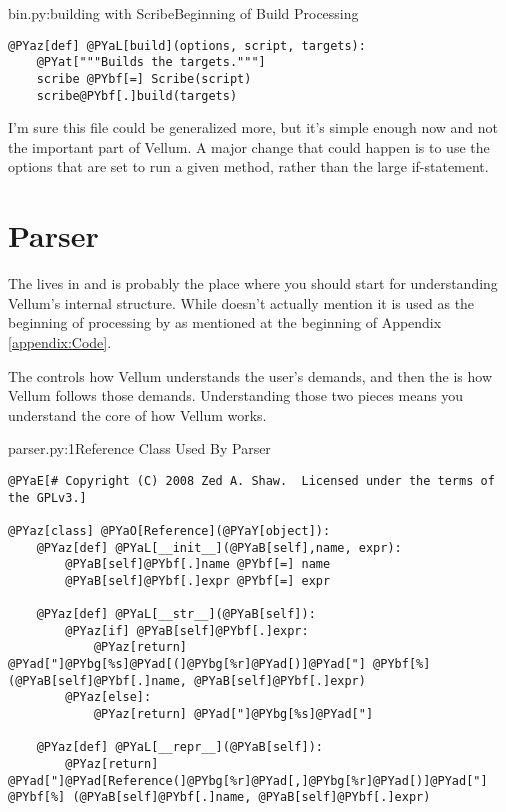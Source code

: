 \begin{code}{bin.py:building with Scribe}{Beginning of Build Processing}
\begin{Verbatim}[commandchars=@\[\]]
@PYaz[def] @PYaL[build](options, script, targets):
    @PYat["""Builds the targets."""]
    scribe @PYbf[=] Scribe(script)
    scribe@PYbf[.]build(targets)
\end{Verbatim}

\end{code}

I'm sure this file could be generalized more, but it's simple enough now and not
the important part of Vellum.  A major change that could happen is to use the
options that are set to run a given method, rather than the large if-statement.




\section{Parser}
\label{appendixA:parser}

The  lives in  and is probably the place where you should
start for understanding Vellum's internal structure.  While 
doesn't actually mention  it is used as the beginning of
processing by  as mentioned at the beginning of Appendix
\ref{appendix:Code}.

The 
controls how Vellum understands the user's demands, and then the 
is how Vellum follows those demands.  Understanding those two pieces means you
understand the core of how Vellum works.

\begin{code}{parser.py:1}{Reference Class Used By Parser}
\begin{Verbatim}[commandchars=@\[\]]
@PYaE[# Copyright (C) 2008 Zed A. Shaw.  Licensed under the terms of the GPLv3.]

@PYaz[class] @PYaO[Reference](@PYaY[object]):
    @PYaz[def] @PYaL[__init__](@PYaB[self],name, expr):
        @PYaB[self]@PYbf[.]name @PYbf[=] name
        @PYaB[self]@PYbf[.]expr @PYbf[=] expr

    @PYaz[def] @PYaL[__str__](@PYaB[self]):
        @PYaz[if] @PYaB[self]@PYbf[.]expr:
            @PYaz[return] @PYad["]@PYbg[%s]@PYad[(]@PYbg[%r]@PYad[)]@PYad["] @PYbf[%] (@PYaB[self]@PYbf[.]name, @PYaB[self]@PYbf[.]expr)
        @PYaz[else]:
            @PYaz[return] @PYad["]@PYbg[%s]@PYad["]

    @PYaz[def] @PYaL[__repr__](@PYaB[self]):
        @PYaz[return] @PYad["]@PYad[Reference(]@PYbg[%r]@PYad[,]@PYbg[%r]@PYad[)]@PYad["] @PYbf[%] (@PYaB[self]@PYbf[.]name, @PYaB[self]@PYbf[.]expr)
\end{Verbatim}

\end{code}

